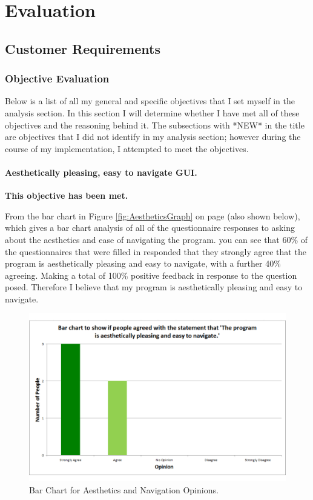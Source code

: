 \chapter{Evaluation}

\section{Customer Requirements}


\subsection{Objective Evaluation}

Below is a list of all my general and specific objectives that I set myself in the analysis section. In this section I will determine whether I have met all of these objectives and the reasoning behind it. The subsections with *NEW* in the title are objectives that I did not identify in my analysis section; however during the course of my implementation, I attempted to meet the objectives. 

\subsubsection{Aesthetically pleasing, easy to navigate GUI.} 

\textbf{This objective has been met.}

From the bar chart in Figure \ref{fig:AestheticsGraph} on page \pageref{fig:AestheticsGraph} (also shown below), which gives a bar chart analysis of all of the questionnaire responses to asking about the aesthetics and ease of navigating the program. you can see that 60\% of the questionnaires that were filled in responded that they strongly agree that the program is aesthetically pleasing and easy to navigate, with a further 40\% agreeing. Making a total of 100\% positive feedback in response to the question posed. Therefore I believe that my program is aesthetically pleasing and easy to navigate.

\begin{figure}[H]
    \includegraphics[width=\textwidth]{./Evaluation/images/AestheticsGraph.pdf}
    \caption{Bar Chart for Aesthetics and Navigation Opinions.} \label{fig:AestheticsGraphCopy}
\end{figure}




